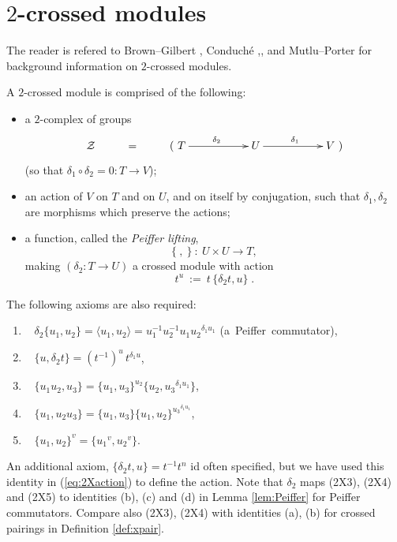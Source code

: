 
\section{$2$-crossed modules} \label{sect:2xmod}

The reader is refered to
Brown--Gilbert \cite{brow:gilb}, 
Conduch\'e \cite{conduche:jpaa},\cite{conduche:gmj}, 
and Mutlu--Porter \cite{mutlu:porter5} 
for background information on $2$-crossed modules.

\begin{defn} 
A $2$-crossed module is comprised of the following: 
\begin{itemize}
\item
a $2$-complex of groups
$$
\xymatrix{
\calZ 
  & = &  (~T \ar[rr]^{\delta_2} 
         &&  U \ar[rr]^{\delta_1}
             && V~) \\
}
$$
(so that  $\delta_1\circ\delta_2 = 0 : T \to V$);
\item
an action of $V$ on $T$ and on $U$, and on itself by conjugation,
such that $\delta_1, \delta_2$ are morphisms which preserve the actions;
\item
a function, called the \emph{Peiffer lifting},
$$
\{~,~\} ~:~ U \times U \to T,
$$
making $(\delta_2 : T \to U)$ a crossed module with action
\begin{equation} \label{eq:2Xaction}
t^u ~:=~ t\,\{\delta_2t,u\}\;.
\end{equation}
\end{itemize}
The following axioms are also required: 
\begin{enumerate}[{\rm (2X1)}]
\item~
$\delta_2\{u_1,u_2\} = \langle u_1, u_2 \rangle
                     = u_1^{-1} u_2^{-1} u_1 {u_2}^{\delta_1 u_1}$ 
\quad\mbox{(a Peiffer commutator)},
\item~
$\{u, \delta_2 t\} = (t^{-1})^u\, t^{\delta_1 u}$,
\item~ 
$\{u_1u_2, u_3\} = \{u_1,u_3\}^{u_2} \{u_2,{u_3}^{\delta_1 u_1}\}$,
\item~ 
$\{u_1, u_2u_3\} = \{u_1,u_3\} \{u_1,u_2\}^{{u_3}^{\delta_1 u_1}}$,
\item~ 
$\{u_1,u_2\}^v = \{{u_1}^v, {u_2}^v\}$.
\end {enumerate}
\end{defn}

\noindent
An additional axiom, $\{\delta_2t,u\} = t^{-1}t^n$ id often specified, 
but we have used this identity in (\ref{eq:2Xaction}) to define the action. 
Note that $\delta_2$ maps {(2X3)}, {(2X4)} and {(2X5)} 
to identities (b), (c) and (d) in Lemma \ref{lem:Peiffer} 
for Peiffer commutators. 
Compare also (2X3), (2X4) with identities (a), (b) for crossed pairings 
in Definition \ref{def:xpair}. 

